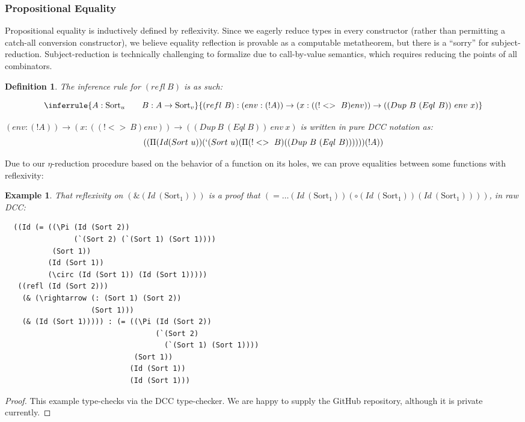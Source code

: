 \documentclass{article}
\newtheorem{definition}{Definition}
\newtheorem{example}{Example}
\newcommand{\arr}{\rightarrow}
\newcommand{\sort}[1]{\text{Sort}_{#1}}
\begin{document}
\subsubsection{Propositional Equality}

Propositional equality is inductively defined by reflexivity. Since we eagerly reduce types in every constructor (rather than permitting a catch-all conversion constructor), we believe equality reflection is provable as a computable metatheorem, but there is a ``sorry'' for subject-reduction. Subject-reduction is technically challenging to formalize due to call-by-value semantics, which requires reducing the points of all combinators.

\begin{definition}
  The inference rule for \((refl\ B)\) is as such:

  \begin{equation}
    \inferrule
    { A : \sort{u} \qquad B : A \arr \sort{v} }
    { (refl\ B) : (env : (! A)) \arr (x : ((!<>\ B) env)) \arr ((Dup\ B\ (Eql\ B))\ env\ x)}
  \end{equation}

  \((env : (! A)) \arr (x : ((!<>\ B) env)) \arr ((Dup\ B\ (Eql\ B))\ env\ x)\) is written in pure DCC notation as:
  \begin{equation}
    ((\Pi (Id (Sort\ u)) (`(Sort\ u) (\Pi (!<>\ B) ((Dup\ B\ (Eql\ B)))))) (! A))
  \end{equation}
\end{definition}

Due to our \(\eta\)-reduction procedure based on the behavior of a function on its holes, we can prove equalities between some functions with reflexivity:

\begin{example}
  That reflexivity on \((\& (Id\ (\sort{1})))\) is a proof that \((= \ldots (Id\ (\sort{1})) (\circ (Id\ (\sort{1})) (Id\ (\sort{1}))))\), in raw DCC:
\begin{verbatim}
  ((Id (= ((\Pi (Id (Sort 2))
                (`(Sort 2) (`(Sort 1) (Sort 1))))
           (Sort 1))
          (Id (Sort 1))
          (\circ (Id (Sort 1)) (Id (Sort 1)))))
   ((refl (Id (Sort 2)))
    (& (\rightarrow (: (Sort 1) (Sort 2))
                    (Sort 1)))
    (& (Id (Sort 1))))) : (= ((\Pi (Id (Sort 2))
                                   (`(Sort 2)
                                     (`(Sort 1) (Sort 1))))
                              (Sort 1))
                             (Id (Sort 1))
                             (Id (Sort 1)))
\end{verbatim}
\end{example}
\begin{proof}
  This example type-checks via the DCC type-checker. We are happy to supply the GitHub repository, although it is private currently.
\end{proof}
\end{document}
